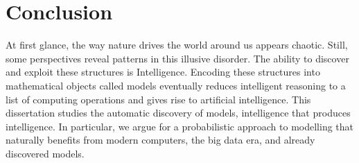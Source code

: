 \chapter{Conclusion}\label{ch:08}
At first glance, the way nature drives the world around us appears chaotic. Still, some perspectives reveal patterns in this illusive disorder. The ability to discover and exploit these structures is Intelligence. Encoding these structures into mathematical objects called models eventually reduces intelligent reasoning to a list of computing operations and gives rise to artificial intelligence. This dissertation studies the automatic discovery of models, intelligence that produces intelligence. In particular, we argue for a probabilistic approach to modelling that naturally benefits from modern computers, the big data era, and already discovered models.

%
%
%
%
%
%
%
%
%

